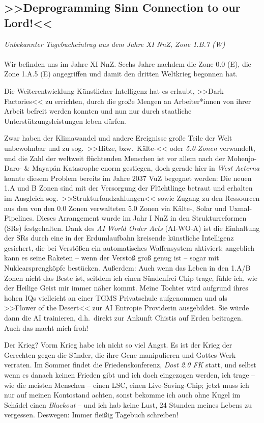 \subsection{>>Deprogramming Sinn Connection to our Lord!<<}
\emph{Unbekannter Tagebucheintrag aus dem Jahre XI NnZ, Zone 1.B.7 (W)}\\\\
%
Wir befinden uns im Jahre XI NnZ. Sechs Jahre nachdem die Zone 0.0 (E), die Zone
1.A.5 (E) angegriffen und damit den dritten Weltkrieg begonnen hat.

Die Weiterentwicklung Künstlicher Intelligenz hat es erlaubt, >>Dark
Factories<< zu errichten, durch die große Mengen an Arbeiter*innen von ihrer
Arbeit befreit werden konnten und nun nur durch staatliche
Unterstützungsleistungen leben dürfen.

Zwar haben der Klimawandel und andere Ereignisse große Teile der Welt
unbewohnbar und zu sog.~>>Hitze, bzw.~Kälte-<< oder \emph{5.0-Zonen} verwandelt,
und die Zahl der weltweit flüchtenden Menschen ist vor allem nach der
Mohenjo-Daro- \& Mayapán Katasrophe enorm gestiegen, doch gerade hier in
\emph{West Aeterna} konnte diesem Problem bereits im Jahre 2037 VuZ begegnet
werden: Die neuen 1.A und B Zonen sind mit der Versorgung der Flüchtlinge
betraut und erhalten im Ausgleich sog.~>>Strukturfondzahlungen<< sowie Zugang zu
den Ressourcen aus den von den 0.0 Zonen verwalteten 5.0 Zonen via Kälte-, Solar
und Uxmal-Pipelines. Dieses Arrangement wurde im Jahr I NnZ in den
Strukturreformen (SRs) festgehalten. Dank des \emph{AI World Order Acts}
(AI-WO-A) ist die Einhaltung der SRs durch eine in der Erdumlaufbahn kreisende
künstliche Intelligenz gesichert, die bei Verstößen ein automatisches
Waffensystem aktiviert; angeblich kann es seine Raketen -- wenn der Verstoß groß
genug ist -- sogar mit Nuklearsprengköpfe bestücken.
Außerdem: Auch wenn das Leben in den 1.A/B Zonen nicht das Beste ist, seitdem
ich einen Sündenfrei Chip trage, fühle ich, wie der Heilige Geist mir immer
näher kommt. Meine Tochter wird aufgrund ihres hohen IQs vielleicht an einer
TGMS Privatschule aufgenommen und als >>Flower of the Desert<< zur AI Entropie
Providerin ausgebildet. Sie würde dann die AI trainieren, d.h.~direkt zur
Ankunft Chistis auf Erden beitragen. Auch das macht mich froh!

Der Krieg? Vorm Krieg habe ich nicht so viel Angst. Es ist der Krieg der
Gerechten gegen die Sünder, die ihre Gene manipulieren und Gottes Werk verraten. 
Im Sommer findet die Friedenskonferenz, \emph{Dost 2.0 FK} statt, und selbst
wenn es danach keinen Frieden gibt und ich doch eingezogen werden, ich trage --
wie die meisten Menschen -- einen LSC, einen Live-Saving-Chip; jetzt muss ich
nur auf meinen Kontostand achten, sonst bekomme ich auch ohne Kugel im Schädel
einen \emph{Blackout} -- und ich hab keine Lust, 24 Stunden meines Lebens zu
vergessen. Deswegen: Immer fleißig Tagebuch schreiben!
